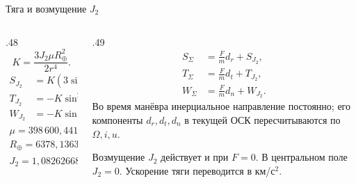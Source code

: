 \documentclass[11pt,aspectratio=169,t]{beamer}
\newcommand{\eqcompact}{\fontsize{10}{12}\selectfont}
\newcommand{\derivationmathspacing}{%
  \setlength{\abovedisplayskip}{2pt}%
  \setlength{\belowdisplayskip}{3pt}%
  \setlength{\abovedisplayshortskip}{2pt}%
  \setlength{\belowdisplayshortskip}{2pt}%
  \setlength{\jot}{2pt}}
\begin{document}
\begin{frame}{Тяга и возмущение $J_2$}
\relax
\derivationmathspacing
\begin{columns}[T,onlytextwidth]
\begin{column}{.48\textwidth}
\[
 K=\frac{3J_2\mu R_\oplus^2}{2r^4}.
\]
{\eqcompact\derivationmathspacing
\[
\begin{aligned}
 S_{J_2}&=K(3\sin^2i\sin^2u-1),\\[4pt]
 T_{J_2}&=-K\sin^2i\sin2u,\\[4pt]
 W_{J_2}&=-K\sin2i\sin u.
\end{aligned}
\]
}
{\eqcompact
\[
\begin{gathered}
 \mu=398\,600{,}4418\ \text{км}^3/\text{с}^2,\\
 R_\oplus=6378{,}1363\ \text{км},\\
 J_2=1{,}08262668\cdot10^{-3}.
\end{gathered}
\]
}
\end{column}
\begin{column}{.49\textwidth}
{\eqcompact\derivationmathspacing
\[
\begin{aligned}
 S_\Sigma&=\frac Fm d_r+S_{J_2},\\
 T_\Sigma&=\frac Fm d_t+T_{J_2},\\
 W_\Sigma&=\frac Fm d_n+W_{J_2}.
\end{aligned}
\]
}
\justifying
Во время манёвра инерциальное направление постоянно;
его компоненты $d_r,d_t,d_n$ в текущей ОСК пересчитываются по $\Omega,i,u$.
\par\smallskip
Возмущение $J_2$ действует и при $F=0$.
В центральном поле $J_2=0$.
Ускорение тяги переводится в км/с$^2$.
\end{column}
\end{columns}
\end{frame}
\end{document}
